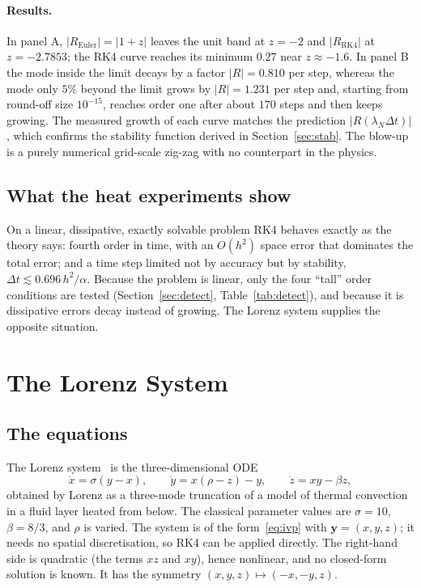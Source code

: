 \documentclass[11pt,a4paper]{article}
\newcommand{\Dt}{\Delta t}
\newcommand{\bfy}{\mathbf{y}}
\begin{document}
\paragraph{Results.} In panel A, $|R_{\mathrm{Euler}}|=|1+z|$ leaves the unit band at $z=-2$ and
$|R_{\mathrm{RK4}}|$ at $z=-2.7853$; the RK4 curve reaches its minimum $0.27$ near $z\approx-1.6$.
In panel B the mode inside the limit decays by a factor $|R|=0.810$ per step, whereas the mode only
$5\%$ beyond the limit grows by $|R|=1.231$ per step and, starting from round-off size $10^{-15}$,
reaches order one after about $170$ steps and then keeps growing. The measured growth of each curve matches the prediction
$|R(\lambda_N\Dt)|$, which confirms the stability function derived in Section~\ref{sec:stab}. The
blow-up is a purely numerical grid-scale zig-zag with no counterpart in the physics.

\subsection{What the heat experiments show}

On a linear, dissipative, exactly solvable problem RK4 behaves exactly as the theory says: fourth order
in time, with an $O(h^2)$ space error that dominates the total error; and a time step limited not by
accuracy but by stability, $\Dt\lesssim0.696\,h^2/\alpha$. Because the problem is linear, only the
four ``tall'' order conditions are tested (Section~\ref{sec:detect}, Table~\ref{tab:detect}), and
because it is dissipative errors decay instead of growing. The Lorenz system supplies the opposite
situation.

\section{The Lorenz System}\label{sec:lorenz}

\subsection{The equations}

The Lorenz system~\cite{lorenz1963} is the three-dimensional ODE
\begin{equation}
\dot x=\sigma(y-x),\qquad \dot y=x(\rho-z)-y,\qquad \dot z=xy-\beta z,
\label{eq:lorenz}
\end{equation}
obtained by Lorenz as a three-mode truncation of a model of thermal convection in a fluid layer heated
from below. The classical parameter values are $\sigma=10$, $\beta=8/3$, and $\rho$ is varied.
The system is of the form~\eqref{eq:ivp} with $\bfy=(x,y,z)$; it needs no spatial discretisation, so RK4
can be applied directly. The right-hand side is quadratic (the terms $xz$ and $xy$), hence nonlinear,
and no closed-form solution is known. It has the symmetry $(x,y,z)\mapsto(-x,-y,z)$.
\end{document}
